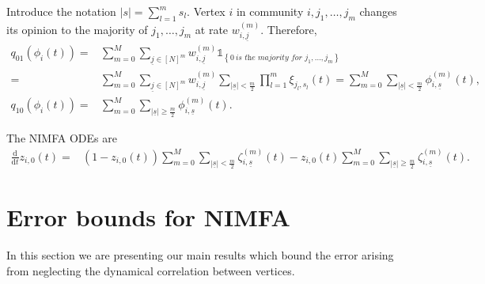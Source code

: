 \documentclass{article}
\newcommand{\ul}{\underline}
\renewcommand{\d}{\mathrm{d}}
\newcommand{\1}[1]{{\mathds{1}}_{\left\{#1\right\}}}
\begin{document}
	Introduce the notation $|s|=\sum_{l=1}^{m}s_l.$ Vertex $i$ in community $i,j_1,\dots,j_m$ changes its opinion to the majority of $j_1,\dots, j_m$ at rate $w_{i,\ul{j}}^{(m)}$. Therefore,
	\begin{align*}
	q_{01}(\phi_{i}(t))=&\sum_{m=0}^{M} \sum_{\ul{j} \in [N]^m}w_{i,\ul{j}}^{(m)}\1{0 \ \textit{is the majority for $j_1, \dots, j_m$}}\\
	=& \sum_{m=0}^{M} \sum_{\ul{j} \in [N]^m}w_{i,\ul{j}}^{(m)} \sum_{|\ul{s}|<\frac{m}{2}} \prod_{l=1}^{m} \xi_{j_l,s_l}(t)=\sum_{m=0}^{M} \sum_{|\ul{s}|<\frac{m}{2}} \phi_{i,\ul{s}}^{(m)}(t), \\
	q_{10}(\phi_{i}(t))=&\sum_{m=0}^{M} \sum_{|\ul{s}| \geq \frac{m}{2}} \phi_{i,\ul{s}}^{(m)}(t).
	\end{align*}
	

	The NIMFA ODEs are
	\begin{align*}
		\frac{\d}{\d t}z_{i,0}(t)=&(1-z_{i,0}(t))\sum_{m=0}^{M} \sum_{|\ul{s}|<\frac{m}{2}} \zeta_{i,\ul{s}}^{(m)}(t)-z_{i,0}(t)\sum_{m=0}^{M} \sum_{|\ul{s}| \geq \frac{m}{2}} \zeta_{i,\ul{s}}^{(m)}(t).
	\end{align*}
	
	
	\section{Error bounds for NIMFA}
	\label{s:errorbounds}
	
	In this section we are presenting our main results which bound the error arising from neglecting the dynamical correlation between vertices. 
	
	
	
\end{document}
